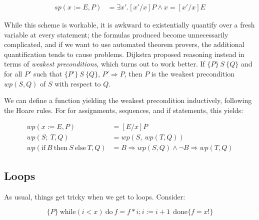 \documentclass[11pt]{article}
\begin{document}
\[
\begin{array}{ll}
sp(x := E, P) & = \exists x' . [x'/x]P \land x = [x'/x]E
\end{array}
\]


While this scheme is workable, it is awkward to existentially quantify over a
fresh variable at every statement; the formulas produced become unnecessarily
complicated, and if we want to use automated theorem provers, the additional
quantification tends to cause problems.  Dijkstra proposed reasoning instead in
terms of \textit{weakest preconditions}, which turns out to work better.
If $\{P\} ~S~ \{Q\}$ and for all $P'$ such that $\{P'\} ~S~ \{Q\}$, $P'
\Rightarrow P$, then $P$ is the weakest precondition $wp(S,Q)$ of $S$ with
respect to $Q$.


We can define a function yielding the weakest precondition inductively,
following the Hoare rules.  For for assignments, sequences, and if
statements, this yields:

\[
\begin{array}{ll}
wp(x := E, P) & = [E/x] P
\\[1ex]
wp(S;~ T, Q) & = wp(S, ~wp(T, Q))
\\[1ex]
wp(\mbox{if}~ B ~\mbox{then}~ S ~\mbox{else}~ T, Q) & = B \Rightarrow wp(S,Q) \land \lnot B \Rightarrow wp(T,Q)
\end{array}
\]


\subsection{Loops}

As usual, things get tricky when we get to loops.  Consider:

\begin{center}
\[
\{P\}~\mbox{while} (i<x)~ \mbox{do}~f=f*i; i:=i+1~~ \mbox{done} \{f=x!\}
\]
\end{center}
\end{document}
